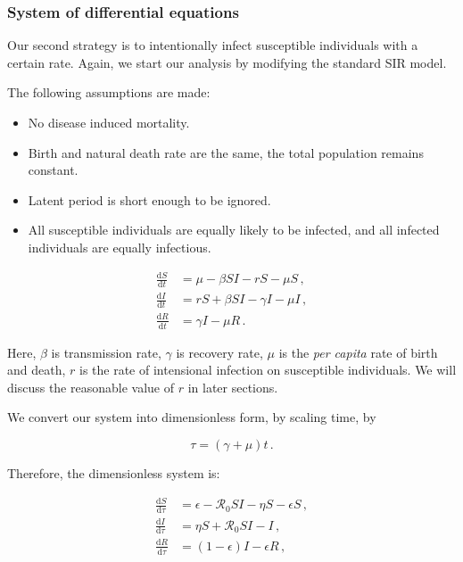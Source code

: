 \documentclass[12pt]{article}
\newcommand\dbyd[2]{\frac{\mathrm d{#1}}{\mathrm d{#2}}}
\newcommand{\R}{\mathcal{R}}
\begin{document}
\subsubsection{System of differential equations}
Our second strategy is to intentionally infect susceptible individuals with a certain rate. Again, we start our analysis by modifying the standard SIR model.

The following assumptions are made:
\begin{itemize}
\item No disease induced mortality.
\item Birth and natural death rate are the same, the total population remains constant.
\item Latent period is short enough to be ignored.
\item All susceptible individuals are equally likely to be infected, and all infected individuals are equally infectious.
\end{itemize}

\begin{linenomath*}
\begin{equation}\label{1}
\begin{split}
\dbyd{S}{t}&=\mu- \beta SI-rS-\mu S\,, \\
\dbyd{I}{t}&=rS+\beta SI-\gamma I -\mu I\,,\\
\dbyd{R}{t}&=\gamma I-\mu R\,.
\end{split}
\end{equation}
\end{linenomath*}

Here, $\beta$ is transmission rate, $\gamma$ is recovery rate, $\mu$ is the \emph{per capita} rate of birth and death, $r$ is the rate of intensional infection on susceptible individuals. We will discuss the reasonable value of $r$ in later sections.

We convert our system into dimensionless form, by scaling time, by

\begin{linenomath*}
\begin{equation}
\tau=(\gamma+\mu)t\,.
\end{equation}
\end{linenomath*}

Therefore, the dimensionless system is:
\begin{linenomath*}
\begin{equation}
\begin{split}
\dbyd{S}{\tau}&=\epsilon- \R_0  SI-\eta S-\epsilon S\,, \\
\dbyd{I}{\tau}&=\eta S+\R_0 SI-I\,,\\
\dbyd{R}{\tau}&=(1-\epsilon)I-\epsilon R\,,
\end{split}
\end{equation}
\end{linenomath*}
\end{document}
